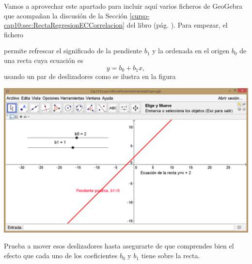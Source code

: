 \documentclass[10pt,a4paper]{article}\usepackage[]{graphicx}\usepackage[]{color}
\begin{document}
Vamos a aprovechar este apartado para incluir aquí varios ficheros de GeoGebra que acompañan la discusión de la Sección \ref{curso-cap10:sec:RectaRegresionECCorrelacion} del libro (pág. \pageref{curso-cap10:sec:RectaRegresionECCorrelacion}). Para empezar, el fichero
\begin{center}
\end{center}
permite refrescar el significado de la pendiente $b_1$ y la ordenada en el origen $b_0$ de una recta cuya ecuación es
\[y = b_0 + b_1 x,\]
usando un par de deslizadores como se ilustra en la figura
\begin{center}
    \includegraphics[width=15.5cm]{../fig/Tut10-20.png}
\end{center}
Prueba a mover esos deslizadores hasta asegurarte de que comprendes bien el efecto que cada uno de los coeficientes $b_0$ y $b_1$ tiene sobre la recta.
\end{document}
